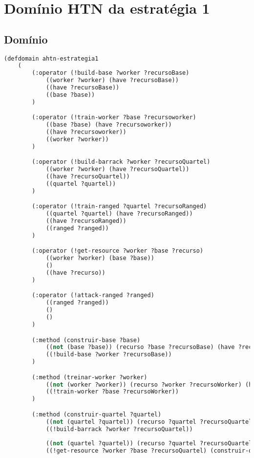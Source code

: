 
\chapter{\label{apendiceA}Domínio HTN da estratégia 1}

\section{Domínio}

\lstset{style=codeStyle}
\begin{lstlisting}[language=lisp]
(defdomain ahtn-estrategia1
	(
		(:operator (!build-base ?worker ?recursoBase)
			((worker ?worker) (have ?recursoBase))
			((have ?recursoBase))
			((base ?base))
		)

		(:operator (!train-worker ?base ?recursoworker)
			((base ?base) (have ?recursoworker))
			((have ?recursoworker))
			((worker ?worker))
		)

		(:operator (!build-barrack ?worker ?recursoQuartel)
			((worker ?worker) (have ?recursoQuartel))
			((have ?recursoQuartel))
			((quartel ?quartel))
		)

		(:operator (!train-ranged ?quartel ?recursoRanged)
			((quartel ?quartel) (have ?recursoRanged))
			((have ?recursoRanged))
			((ranged ?ranged))
		)

		(:operator (!get-resource ?worker ?base ?recurso)
			((worker ?worker) (base ?base))
			()
			((have ?recurso))
		)

		(:operator (!attack-ranged ?ranged)
			((ranged ?ranged))
			()
			()
		)

		(:method (construir-base ?base)
			((not (base ?base)) (recurso ?base ?recursoBase) (have ?recursoBase) (worker ?worker))
			((!build-base ?worker ?recursoBase))
		)

		(:method (treinar-worker ?worker)
			((not (worker ?worker)) (recurso ?worker ?recursoWorker) (have ?recursoWorker) (base ?base))
			((!train-worker ?base ?recursoWorker))
		)

		(:method (construir-quartel ?quartel)
			((not (quartel ?quartel)) (recurso ?quartel ?recursoQuartel) (have ?recursoQuartel) (worker ?worker)) 
			((!build-barrack ?worker ?recursoQuartel))
			
			((not (quartel ?quartel)) (recurso ?quartel ?recursoQuartel) (not (have ?recursoQuartel)) (worker ?worker) (base ?base))
			((!get-resource ?worker ?base ?recursoQuartel) (construir-quartel ?quartel))
			

\end{lstlisting}
